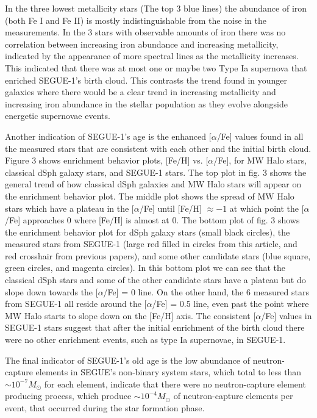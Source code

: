 \documentclass{aastex631}
\begin{document}

In the three lowest metallicity stars (The top 3 blue lines) the abundance of iron (both Fe I and Fe II) is mostly indistinguishable
from the noise in the measurements. In the 3 stars with observable amounts of iron there was no correlation between increasing
iron abundance and increasing metallicity, indicated by the appearance of more spectral lines as the metallicity increases.
This indicated that there was at most one or maybe two Type Ia supernova that enriched SEGUE-1's birth cloud. This
contrasts the trend found in younger galaxies where there would be a clear trend in increasing metallicity and increasing
iron abundance in the stellar population as they evolve alongside energetic supernovae events.


Another indication of SEGUE-1's age is the enhanced [$\alpha$/Fe] values found in all the measured stars that are consistent with each other
and the initial birth cloud. Figure 3 shows enrichment behavior plots, [Fe/H] vs. [$\alpha$/Fe], for MW Halo stars, classical dSph galaxy stars, and SEGUE-1 stars.
The top plot in fig. 3 shows the general trend of how classical dSph galaxies and MW Halo stars will appear on the enrichment behavior plot.
The middle plot shows the spread of MW Halo stars which have a plateau in the [$\alpha$/Fe] until [Fe/H] $\approx -1$ at which point
the [$\alpha$/Fe] approaches 0 where [Fe/H] is almost at 0. The bottom plot of fig. 3 shows the enrichment behavior plot for dSph galaxy
stars (small black circles), the measured stars from SEGUE-1 (large red filled in circles from this article, and red crosshair from
previous papers), and some other candidate stars (blue square, green circles, and magenta circles). In this bottom plot we can see that
the classical dSph stars and some of the other candidate stars have a plateau but do slope down towards the [$\alpha$/Fe] = 0 line.
On the other hand, the 6 measured stars from SEGUE-1 all reside around the [$\alpha$/Fe] = 0.5 line, even past the point where MW
Halo starts to slope down on the [Fe/H] axis. The consistent [$\alpha$/Fe] values in SEGUE-1 stars suggest that after the initial
enrichment of the birth cloud there were no other enrichment events, such as type Ia supernovae, in SEGUE-1.


The final indicator of SEGUE-1's old age is the low abundance of neutron-capture elements in SEGUE's non-binary system stars,
which total to less than \(\sim 10^{-7} M_{\odot}\) for each element, indicate that there were no neutron-capture element producing
process, which produce \(\sim 10^{-4} M_{\odot}\) of neutron-capture elements per event, that occurred during the star formation phase.
\end{document}
